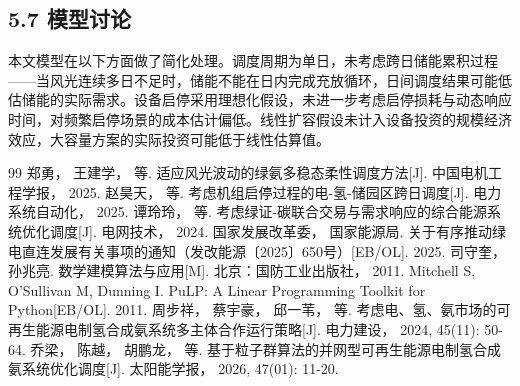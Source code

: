 \documentclass[zihao=-4,a4paper]{ctexart} %
\begin{document}
	\subsection*{5.7 模型讨论}
	
	本文模型在以下方面做了简化处理。调度周期为单日，未考虑跨日储能累积过程——当风光连续多日不足时，储能不能在日内完成充放循环，日间调度结果可能低估储能的实际需求。设备启停采用理想化假设\cite{2}，未进一步考虑启停损耗与动态响应时间，对频繁启停场景的成本估计偏低。线性扩容假设未计入设备投资的规模经济效应，大容量方案的实际投资可能低于线性估算值。
	
	
	\begin{thebibliography}{99}
		 郑勇， 王建学， 等. 适应风光波动的绿氨多稳态柔性调度方法[J]. 中国电机工程学报， 2025.
		 赵昊天， 等. 考虑机组启停过程的电-氢-储园区跨日调度[J]. 电力系统自动化， 2025.
		 谭玲玲， 等. 考虑绿证-碳联合交易与需求响应的综合能源系统优化调度[J]. 电网技术， 2024.
		 国家发展改革委， 国家能源局. 关于有序推动绿电直连发展有关事项的通知（发改能源〔2025〕650号）[EB/OL]. 2025.
		 司守奎， 孙兆亮. 数学建模算法与应用[M]. 北京：国防工业出版社， 2011.
		 Mitchell S, O'Sullivan M, Dunning I. PuLP: A Linear Programming Toolkit for Python[EB/OL]. 2011.
		 周步祥， 蔡宇豪， 邱一苇， 等. 考虑电、氢、氨市场的可再生能源电制氢合成氨系统多主体合作运行策略[J]. 电力建设， 2024, 45(11): 50-64.
		 乔梁， 陈越， 胡鹏龙， 等. 基于粒子群算法的并网型可再生能源电制氢合成氨系统优化调度[J]. 太阳能学报， 2026, 47(01): 11-20.
	\end{thebibliography}
	
\end{document}
